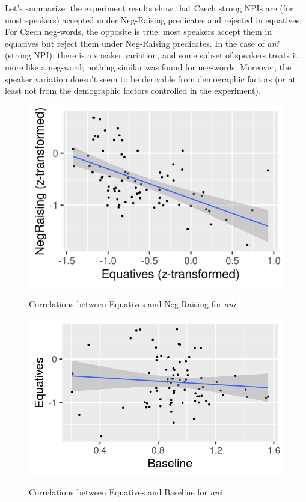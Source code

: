 Let's summarize: the experiment results show that Czech strong NPIs are (for most speakers) accepted under Neg-Raising predicates and rejected in equatives. For Czech neg-words, the opposite is true: most speakers accept them in equatives but reject them under Neg-Raising predicates. In the case of \textit{ani} (strong NPI), there is a speaker variation, and some subset of speakers treats it more like a neg-word; nothing similar was found for neg-words. Moreover, the speaker variation doesn't seem to be derivable from demographic factors (or at least not from the demographic factors controlled in the experiment).

\begin{figure}
    \centering
    \caption{Correlations between Equatives and Neg-Raising for \textit{ani}}
    \includegraphics[scale=0.6]{correlations_ani.png}
    \label{fig-ani-corr}
\end{figure}
  
\begin{figure}
  \centering
  \caption{Correlations between Equatives and Baseline for \textit{ani}}
  \includegraphics[scale=0.6]{equatives_baseline_corr.png}
  \label{fig-ani-bas-corr}
\end{figure}

